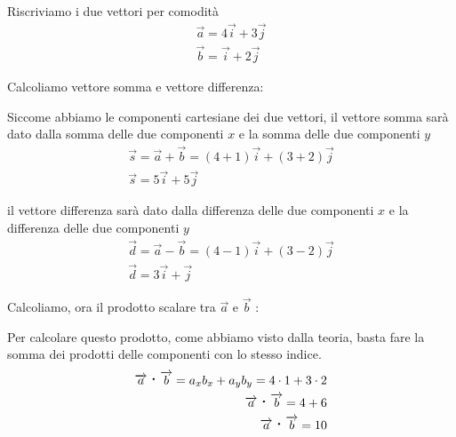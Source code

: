 \documentclass[a4paper]{book}
\newcommand{\prodscal}{\text{\large{\textbf{\textperiodcentered}}}} %
\begin{document}
Riscriviamo i due vettori per comodità
\begin{align*}
\overrightarrow{a} = 4 \overrightarrow{i} + 3 \overrightarrow{j} \\
\overrightarrow{b} = \overrightarrow{i} + 2 \overrightarrow{j}
\end{align*}

Calcoliamo vettore somma e vettore differenza:

Siccome abbiamo le componenti cartesiane dei due vettori, il vettore somma sarà dato dalla somma delle due componenti $ x $ e la somma delle due componenti $ y $
\begin{align*}
\overrightarrow{s} = \overrightarrow{a} + \overrightarrow{b} = ( 4 + 1 )\overrightarrow{i} + ( 3 + 2 ) \overrightarrow{j} \\
\overrightarrow{s} = 5 \overrightarrow{i} + 5 \overrightarrow{j}
\end{align*}

il vettore differenza sarà dato dalla differenza delle due componenti $ x $ e la differenza delle due componenti $ y $
\begin{align*}
\overrightarrow{d} = \overrightarrow{a} - \overrightarrow{b} = ( 4 - 1 )\overrightarrow{i} + ( 3 - 2 ) \overrightarrow{j} \\
\overrightarrow{d} = 3 \overrightarrow{i} + \overrightarrow{j}
\end{align*}

Calcoliamo, ora il prodotto scalare tra $ \overrightarrow{a} $ e $ \overrightarrow{b} $ :

Per calcolare questo prodotto, come abbiamo visto dalla teoria, basta fare la somma dei prodotti delle componenti con lo stesso indice.
\begin{align*}
\overrightarrow{a} \prodscal \overrightarrow{b} = a_{x} b_{x} + a_{y} b_{y} = 4 \cdot 1 + 3 \cdot 2 \\
\overrightarrow{a} \prodscal \overrightarrow{b} = 4 + 6 \\
\overrightarrow{a} \prodscal \overrightarrow{b} = 10
\end{align*}
\end{document}
